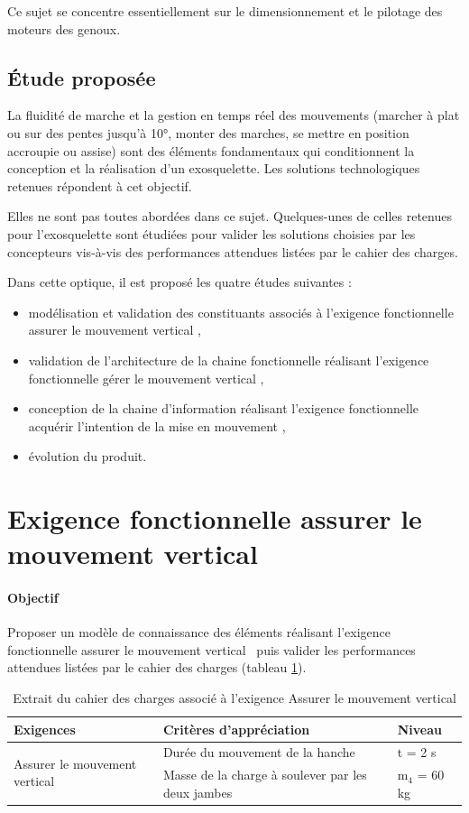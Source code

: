 Ce sujet se concentre essentiellement sur le dimensionnement et le pilotage des moteurs des genoux.

\subsection{Étude proposée}

La fluidité de marche et la gestion en temps réel des mouvements (marcher à plat ou sur des pentes jusqu'à 10°, monter des marches, se mettre en position accroupie ou assise) sont des éléments fondamentaux qui conditionnent la conception et la réalisation d'un exosquelette. Les solutions technologiques retenues répondent à cet objectif.

Elles ne sont pas toutes abordées dans ce sujet. Quelques-unes de celles retenues pour l'exosquelette sont étudiées pour valider les solutions choisies par les concepteurs vis-à-vis des performances attendues listées par le cahier des charges.

Dans cette optique, il est proposé les quatre études suivantes :
\begin{itemize}
 \item modélisation et validation des constituants associés à l'exigence fonctionnelle \og assurer le mouvement vertical \fg,
 \item validation de l'architecture de la chaine fonctionnelle réalisant l'exigence fonctionnelle \og gérer le mouvement vertical \fg,
 \item conception de la chaine d'information réalisant l'exigence fonctionnelle \og acquérir l'intention de la mise en mouvement \fg,
 \item évolution du produit.
\end{itemize}

\section{Exigence fonctionnelle \og assurer le mouvement vertical \fg}

\paragraph{Objectif}

Proposer un modèle de connaissance des éléments réalisant l'exigence fonctionnelle \og assurer le mouvement vertical \fg\ puis valider les performances attendues listées par le cahier des charges (tableau \ref{tab01}).

\begin{table}[!h]
\begin{tabular}{|l|l|l|}
\hline
Exigences & Critères d'appréciation & Niveau \\
\hline
\multirow{2}{*}{Assurer le mouvement vertical} & Durée du mouvement de la hanche & t = 2 s \\
 & Masse de la charge à soulever par les deux jambes & m$_4$ = 60 kg \\
\hline
\end{tabular}
 \caption{Extrait du cahier des charges associé à l'exigence \og Assurer le mouvement vertical \fg}
 \label{tab01}
\end{table}

